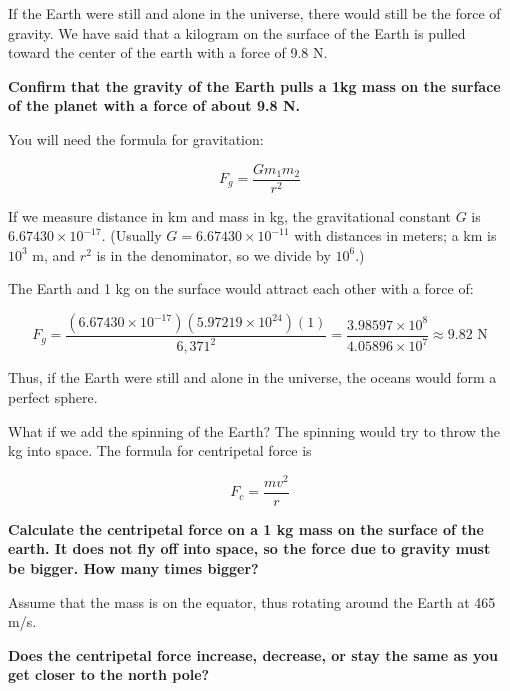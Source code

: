\begin{Exercise}[title={Life Among the Orbits 1: Earth Gravity}, label=life-orbits1]


If the Earth were still and alone in the universe,  there would still be the force of gravity.  We have said that a kilogram on the surface of the Earth is pulled toward the center of the earth with a force of 9.8 N.   

\textbf{Confirm that the gravity of the Earth pulls a 1kg mass on the surface of the planet with a force of about 9.8 N.}

You will need the formula for gravitation: 

$$F_g = \frac{G m_1 m_2}{r^2}$$

If we measure distance in km and mass in kg, the gravitational constant
$G$ is $6.67430 \times 10^{-17}$. (Usually $G = 6.67430 \times 10^{-11}$ with
distances in meters; a km is $10^3$ m, and $r^2$ is in the denominator, so
we divide by $10^6$.)

\end{Exercise}
\begin{Answer}[ref=life-orbits1]

The Earth and 1 kg on the surface would attract each other with a force of:

$$F_g = \frac{\left( 6.67430 \times 10^{-17} \right) \left(5.97219 \times 10^{24}\right) \left(1\right)}{6,371^2} =  
\frac{3.98597 \times 10^{8}}{4.05896 \times 10^{7}} \approx 9.82 \text{ N}$$

Thus, if the Earth were still and alone in the universe,  the oceans would form a perfect sphere.

\end{Answer}

\begin{Exercise}[title={Life Among the Orbits 2: Earth Centripetal Force}, label=life-orbits2]

What if we add the spinning of the Earth?  The spinning would try to throw the kg into space.  The 
formula for centripetal force is

$$F_c = \frac{m v^2}{r} $$

\textbf{Calculate the centripetal force on a 1 kg mass on the surface of the earth.   It does not fly off into space,  so the force due to gravity must be bigger.  How many times bigger?}

Assume that the mass is on the equator,  thus rotating around the Earth at 465 m/s.

\textbf{Does the centripetal force increase, decrease, or stay the same as you get closer to the north pole?}

\end{Exercise}

